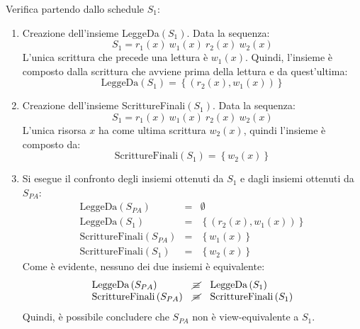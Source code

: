 \documentclass[a4paper]{article}
\begin{document}
	\noindent
	Verifica partendo dallo schedule $S_{1}$:
	\begin{enumerate}
		\item Creazione dell'insieme LeggeDa$\left(S_{1}\right)$. Data la sequenza:
		\begin{equation*}
			S_{1} = r_{1}\left(x\right) \: w_{1}\left(x\right) \: r_{2}\left(x\right) \: w_{2}\left(x\right)
		\end{equation*}
		L'unica scrittura che precede una lettura è $w_{1}\left(x\right)$. Quindi, l'insieme è composto dalla scrittura che avviene prima della lettura e da quest'ultima:
		\begin{equation*}
			\text{LeggeDa}\left(S_{1}\right) = \left\{\left(r_{2}\left(x\right), w_{1}\left(x\right)\right)\right\}
		\end{equation*}
		
		\item Creazione dell'insieme ScrittureFinali$\left(S_{1}\right)$. Data la sequenza:
		\begin{equation*}
			S_{1} = r_{1}\left(x\right) \: w_{1}\left(x\right) \: r_{2}\left(x\right) \: w_{2}\left(x\right)
		\end{equation*}
		L'unica risorsa $x$ ha come ultima scrittura $w_{2}\left(x\right)$, quindi l'insieme è composto da:
		\begin{equation*}
			\text{ScrittureFinali}\left(S_{1}\right) = \left\{w_{2}\left(x\right)\right\}
		\end{equation*}
		
		\item Si esegue il confronto degli insiemi ottenuti da $S_{1}$ e dagli insiemi ottenuti da $S_{PA}$:
		\begin{equation*}
			\begin{array}{lll}
				\text{LeggeDa}\left(S_{PA}\right)	&=& \emptyset \\
				\text{LeggeDa}\left(S_{1}\right)	&=& \left\{\left(r_{2}\left(x\right), w_{1}\left(x\right)\right)\right\} \\
				\text{ScrittureFinali}\left(S_{PA}\right)	&=& \left\{w_{1}\left(x\right)\right\} \\
				\text{ScrittureFinali}\left(S_{1}\right)	&=& \left\{w_{2}\left(x\right)\right\}
			\end{array}
		\end{equation*}
		Come è evidente, nessuno dei due insiemi è equivalente:
		\begin{equation*}
			\begin{array}{lll}
				\text{LeggeDa}\left(S_{PA}\right)	&\cancel{\equiv}& \text{LeggeDa}\left(S_{1}\right) \\
				\text{ScrittureFinali}\left(S_{PA}\right)	&\cancel{\equiv}& \text{ScrittureFinali}\left(S_{1}\right)
			\end{array}
		\end{equation*}
		Quindi, è possibile concludere che $S_{PA}$ non è view-equivalente a $S_{1}$.
	\end{enumerate}\newpage
	
\end{document}
